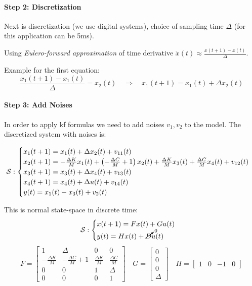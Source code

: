 \begin{example}
    \paragraph{Step 2: Discretization}
    Next is discretization (we use digital systems), choice of sampling time $\Delta$ (for this application can be 5ms).

    Using \emph{Eulero-forward approximation} of time derivative $\dot{x}(t) \approx \frac{x(t+1)-x(t)}{\Delta}$.

    Example for the first equation:
    \[
        \frac{x_1(t+1)-x_1(t)}{\Delta} = x_2(t) \quad\Rightarrow\quad x_1(t+1) = x_1(t) + \Delta x_2(t)
    \]

    \paragraph{Step 3: Add Noises} In order to apply \gls{kf} formulas we need to add noises $v_1, v_2$ to the model. 
    The discretized system with noises is:

    \[  
        \mathcal{S}:
        \begin{cases}
            x_1(t+1) = x_1(t) + \Delta x_2(t) + v_{11}(t) \\
            x_2(t+1) = -\frac{\Delta K}{M} x_1(t) + \left( -\frac{\Delta C}{M} + 1 \right)x_2(t) + \frac{\Delta K}{M} x_3(t) + \frac{\Delta C}{M} x_4(t) + v_{12}(t) \\
            x_3(t+1) = x_3(t) + \Delta x_4(t) + v_{13}(t) \\
            x_4(t+1) = x_4(t) + \Delta u(t) + v_{14}(t) \\
            y(t) = x_1(t) - x_3(t) + v_2(t)
        \end{cases}
    \]

    This is normal state-space in discrete time:
    \[  
        \mathcal{S}:
        \begin{cases}
            x(t+1) = Fx(t) + Gu(t) \\
            y(t) = Hx(t) + \cancelto{0}{D}u(t)
        \end{cases}
    \]
    \[
        F = \begin{bmatrix}
            1 & \Delta & 0 & 0 \\
            -\frac{\Delta K}{M} & -\frac{\Delta C}{M}+1 & \frac{\Delta K}{M} & \frac{\Delta C}{M} \\
            0 & 0 & 1 & \Delta \\
            0 & 0 & 0 & 1
        \end{bmatrix}
        \quad G = \begin{bmatrix}
            0 \\ 0 \\ 0 \\ \Delta
        \end{bmatrix}
        \quad H = \begin{bmatrix}
            1 & 0 & -1 & 0
        \end{bmatrix}
    \]


\end{example}
